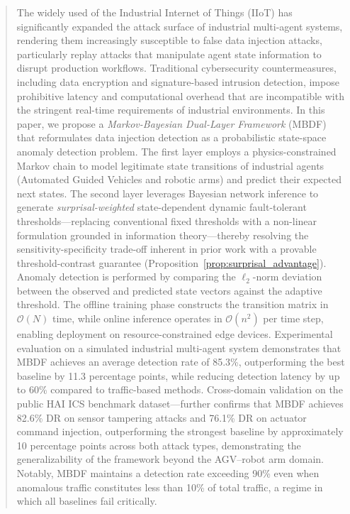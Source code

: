 \documentclass[manuscript,screen,review]{acmart}
\begin{document}
\begin{abstract}
The widely used of the Industrial Internet of Things (IIoT) has
significantly expanded the attack surface of industrial multi-agent
systems, rendering them increasingly susceptible to false data
injection attacks, particularly replay attacks that manipulate
agent state information to disrupt production workflows. Traditional
cybersecurity countermeasures, including data encryption and
signature-based intrusion detection, impose prohibitive latency and
computational overhead that are incompatible with the stringent
real-time requirements of industrial environments. In this paper,
we propose a \textit{Markov-Bayesian Dual-Layer Framework} (MBDF)
that reformulates data injection detection as a probabilistic
state-space anomaly detection problem. The first layer employs a
physics-constrained Markov chain to model legitimate state
transitions of industrial agents (Automated Guided Vehicles and
robotic arms) and predict their expected next states. The second layer leverages Bayesian network inference to
generate \emph{surprisal-weighted} state-dependent dynamic
fault-tolerant thresholds---replacing conventional fixed
thresholds with a non-linear formulation grounded in
information theory---thereby resolving the
sensitivity-specificity trade-off inherent in prior work
with a provable threshold-contrast guarantee
(Proposition~\ref{prop:surprisal_advantage}). Anomaly
detection is performed by comparing the $\ell_2$-norm deviation
between the observed and predicted state vectors against the
adaptive threshold. The offline training phase constructs the
transition matrix in $\mathcal{O}(N)$ time, while online inference
operates in $\mathcal{O}(n^2)$ per time step, enabling deployment
on resource-constrained edge devices. Experimental evaluation on a simulated industrial multi-agent
system demonstrates that MBDF achieves an average detection rate of
85.3\%, outperforming the best baseline by 11.3 percentage
points, while reducing detection latency by up to 60\% compared
to traffic-based methods. Cross-domain validation on the public
HAI ICS benchmark dataset---further confirms that MBDF achieves 82.6\% DR on
sensor tampering attacks and 76.1\% DR on actuator command
injection, outperforming the strongest baseline by approximately
10 percentage points across both attack types, demonstrating
the generalizability of the framework beyond the AGV--robot
arm domain. Notably, MBDF maintains
a detection rate exceeding 90\% even when anomalous traffic
constitutes less than 10\% of total traffic, a regime in which
all baselines fail critically.
\end{abstract}
\end{document}
